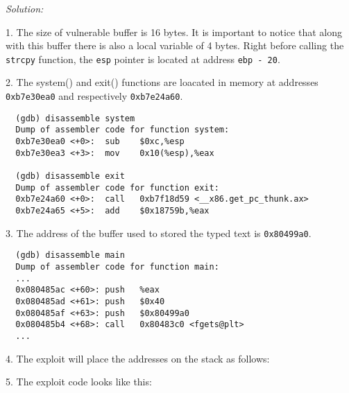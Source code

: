 \documentclass[a4paper,11pt]{article}
\newenvironment{solution}%
{\par{\noindent\small\textit{Solution:}}\vspace{-12pt}\begin{framed}}%
{\end{framed}\par}
\begin{document}
\ifsolution
\begin{solution}
1. The size of vulnerable buffer is 16 bytes. It is important to notice that along with this buffer there is also a local variable of 4 bytes. Right before calling the \texttt{strcpy} function, the \texttt{esp} pointer is located at address \texttt{ebp - 20}.

2. The system() and exit() functions are loacated in memory at addresses \texttt{0xb7e30ea0} and respectively \texttt{0xb7e24a60}.  

\begin{lstlisting}
  (gdb) disassemble system
  Dump of assembler code for function system:
  0xb7e30ea0 <+0>:	sub    $0xc,%esp
  0xb7e30ea3 <+3>:	mov    0x10(%esp),%eax

  (gdb) disassemble exit
  Dump of assembler code for function exit:
  0xb7e24a60 <+0>:	call   0xb7f18d59 <__x86.get_pc_thunk.ax>
  0xb7e24a65 <+5>:	add    $0x18759b,%eax
\end{lstlisting}

3. The address of the buffer used to stored the typed text  is \texttt{0x80499a0}.

\begin{lstlisting}
  (gdb) disassemble main
  Dump of assembler code for function main:
  ...
  0x080485ac <+60>:	push   %eax
  0x080485ad <+61>:	push   $0x40
  0x080485af <+63>:	push   $0x80499a0
  0x080485b4 <+68>:	call   0x80483c0 <fgets@plt>
  ...
\end{lstlisting}

4. The exploit will place the addresses on the stack as follows:


5. The exploit code looks like this:


\end{solution}
\end{document}
